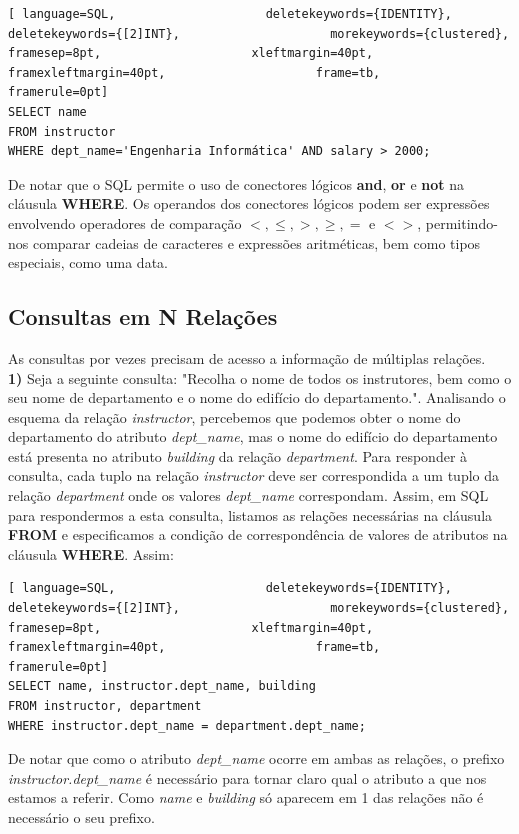 \documentclass[oneside]{book}
\theoremstyle{definition}
\begin{document}
\begin{lstlisting}[ language=SQL,                     deletekeywords={IDENTITY},                     deletekeywords={[2]INT},                     morekeywords={clustered},                     framesep=8pt,                     xleftmargin=40pt,                     framexleftmargin=40pt,                     frame=tb,                     framerule=0pt]
SELECT name
FROM instructor
WHERE dept_name='Engenharia Informática' AND salary > 2000;
\end{lstlisting}
De notar que o SQL permite o uso de conectores lógicos \textbf{and}, \textbf{or} e \textbf{not} na cláusula \textbf{WHERE}. Os operandos dos conectores lógicos podem ser expressões envolvendo operadores de comparação $<, \leq, >, \geq, =$ e $<>$, permitindo-nos comparar cadeias de caracteres e expressões aritméticas, bem como tipos especiais, como uma data.

\subsection{Consultas em N Relações}
As consultas por vezes precisam de acesso a informação de múltiplas relações. \\
\textbf{1)} Seja a seguinte consulta: "Recolha o nome de todos os instrutores, bem como o seu nome de departamento e o nome do edifício do departamento.". Analisando o esquema da relação \textit{instructor}, percebemos que podemos obter o nome do departamento do atributo \textit{dept\_name}, mas o nome do edifício do departamento está presenta no atributo \textit{building} da relação \textit{department}. Para responder à consulta, cada tuplo na relação \textit{instructor} deve ser correspondida a um tuplo da relação \textit{department} onde os valores \textit{dept\_name} correspondam. Assim, em SQL para respondermos a esta consulta, listamos as relações necessárias na cláusula \textbf{FROM} e especificamos a condição de correspondência de valores de atributos na cláusula \textbf{WHERE}. Assim:

\begin{lstlisting}[ language=SQL,                     deletekeywords={IDENTITY},                     deletekeywords={[2]INT},                     morekeywords={clustered},                     framesep=8pt,                     xleftmargin=40pt,                     framexleftmargin=40pt,                     frame=tb,                     framerule=0pt]
SELECT name, instructor.dept_name, building
FROM instructor, department
WHERE instructor.dept_name = department.dept_name;
\end{lstlisting} 
De notar que como o atributo \textit{dept\_name} ocorre em ambas as relações, o prefixo \textit{instructor.dept\_name} é necessário para tornar claro qual o atributo a que nos estamos a referir. Como \textit{name} e \textit{building} só aparecem em 1 das relações não é necessário o seu prefixo.
\end{document}
